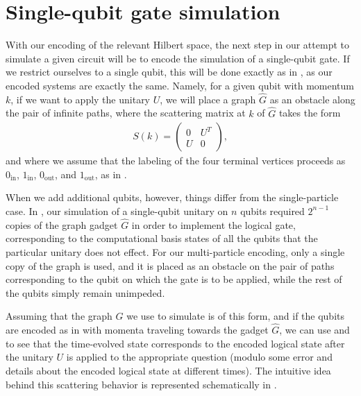 \documentclass[../thesis-main/thesis-main]{subfiles}
\begin{document}
\section{Single-qubit gate simulation}\label{sec:MP_single_qubit_gate_simulation}

With our encoding of the relevant Hilbert space, the next step in our attempt to simulate a given circuit will be to encode the simulation of a single-qubit gate. If we restrict ourselves to a single qubit, this will be done exactly as in , as our encoded systems are exactly the same.  Namely, for a given qubit with momentum $k$, if we want to apply the unitary $U$, we will place a graph $\widehat{G}$ as an obstacle along the pair of infinite paths, where the scattering matrix at $k$ of $\widehat{G}$ takes the form
\begin{align}
  S(k) = \begin{pmatrix}
    0& U^T\\
    U & 0
  \end{pmatrix},\label{eq:MP_unitary_s_matrix}
\end{align}
and where we assume that the labeling of the four terminal vertices proceeds as $0_{\text{in}}$, $1_{\text{in}}$, $0_{\text{out}}$, and $1_{\text{out}}$, as in . 

When we add additional qubits, however, things differ from the single-particle case.  In , our simulation of a single-qubit unitary on $n$ qubits required $2^{n-1}$ copies of the graph gadget $\widehat{G}$ in order to implement the logical gate, corresponding to the computational basis states of all the qubits that the particular unitary does not effect.  For our multi-particle encoding, only a single copy of the graph is used, and it is placed as an obstacle on the pair of paths corresponding to the qubit on which the gate is to be applied, while the rest of the qubits simply remain unimpeded.  

Assuming that the graph $G$ we use to simulate is of this form, and if the qubits are encoded as in  with momenta traveling towards the gadget $\widehat{G}$, we can use  and  to see that the time-evolved state corresponds to the encoded logical state after the unitary $U$ is applied to the appropriate question (modulo some error and details about the encoded logical state at different times).  The intuitive idea behind this scattering behavior is represented schematically in .
\end{document}

